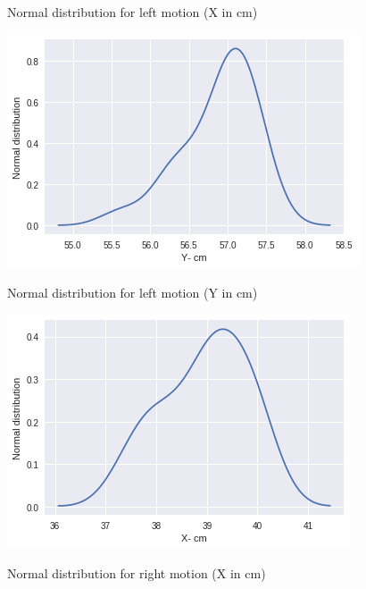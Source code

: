 \documentclass[11pt,a4paper]{article}
\begin{document}
\begin{itemize}
\begin{figure}[H]
			\label{fig:straightG}
			\caption{Normal distribution for left motion (X in cm)}
		\end{figure}
		\begin{figure}[H]
			\centering	
			\includegraphics[width=0.8\linewidth]{old_leftmotion_kdeplot_Y}
			\label{fig:straightG}
			\caption{Normal distribution for left motion (Y in cm)}
		\end{figure}
		\begin{figure}[H]
			\centering	
			\includegraphics[width=0.8\linewidth]{old_rightmotion_kdeplot_X}
			\label{fig:straightG}
			\caption{Normal distribution for right motion (X in cm)}
		\end{figure}
		

\end{itemize}
\end{document}
